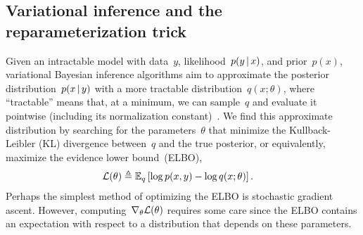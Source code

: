 \documentclass[twoside]{article}
\begin{document}
\subsection{Variational inference and the reparameterization trick}
\label{sub:repa}
Given an intractable model with data~$y$, likelihood~$p(y \, | \, x)$,
and prior~$p(x)$, variational Bayesian inference algorithms aim to
approximate the posterior distribution~$p(x \, | \, y)$ with a more
tractable distribution~$q(x; \theta)$, where ``tractable'' means that,
at a minimum, we can sample~$q$ and evaluate it pointwise (including
its normalization constant)~\citep{Blei2017}.  We find this
approximate distribution by searching for the parameters~$\theta$ that
minimize the Kullback-Leibler (KL) divergence between~$q$ and the true
posterior, or equivalently, maximize the evidence lower bound~(ELBO),
\begin{align*}
  \mathcal{L}(\theta) &\triangleq \mathbb{E}_q \left[ \log p(x, y) - \log q(x; \theta) \right].
\end{align*}
Perhaps the simplest method of optimizing the ELBO is stochastic
gradient ascent.  However, computing~$\nabla_\theta \mathcal{L}(\theta)$
requires some care since the ELBO contains an expectation with respect
to a distribution that depends on these parameters.
\end{document}
